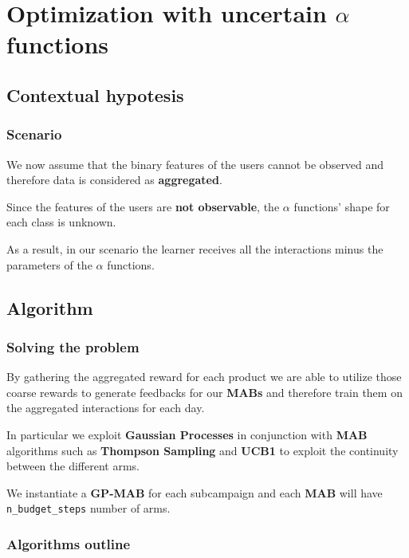 \chapter{Optimization with uncertain \texorpdfstring{$\alpha$}{alpha} functions}
\label{chap:unc_alpha}

\section{Contextual hypotesis}

\subsection{Scenario}

We now assume that the binary features of the users cannot be observed and therefore data is considered as \textbf{aggregated}.

Since the features of the users are \textbf{not observable}, the $\alpha$ functions' shape for each class is unknown.

As a result, in our scenario the learner receives all the interactions minus the parameters of the $\alpha$ functions.

\section{Algorithm}

\subsection{Solving the problem}

By gathering the aggregated reward for each product we are able to utilize those coarse rewards to generate feedbacks for our \textbf{MABs} and therefore train them on the aggregated interactions for each day.

In particular we exploit \textbf{Gaussian Processes} in conjunction with \textbf{MAB} algorithms such as \textbf{Thompson Sampling} and \textbf{UCB1} to exploit the continuity between the different arms.

We instantiate a \textbf{GP-MAB} for each subcampaign and each \textbf{MAB} will have \texttt{n\_budget\_steps} number of arms.

\subsection{Algorithms outline}

